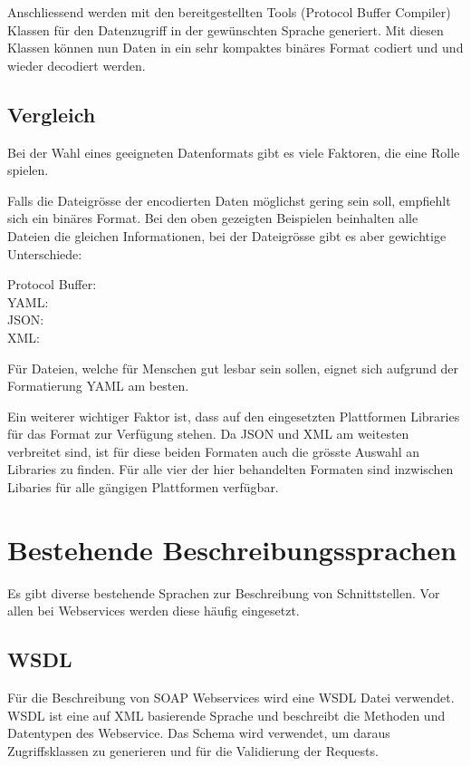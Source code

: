 Anschliessend werden mit den bereitgestellten Tools (Protocol Buffer Compiler) Klassen für den Datenzugriff in der gewünschten Sprache generiert. Mit diesen Klassen können nun Daten in ein sehr kompaktes binäres Format codiert und und wieder decodiert werden.

\subsection{Vergleich}

Bei der Wahl eines geeigneten Datenformats gibt es viele Faktoren, die eine Rolle spielen.

Falls die Dateigrösse der encodierten Daten möglichst gering sein soll, empfiehlt sich ein binäres Format. Bei den oben gezeigten Beispielen beinhalten alle Dateien die gleichen Informationen, bei der Dateigrösse gibt es aber gewichtige Unterschiede:

Protocol Buffer:   \\
YAML:              \\
JSON:              \\
XML:              

Für Dateien, welche für Menschen gut lesbar sein sollen, eignet sich aufgrund der Formatierung YAML am besten. 

Ein weiterer wichtiger Faktor ist, dass auf den eingesetzten Plattformen Libraries für das Format zur Verfügung stehen. Da JSON und XML am weitesten verbreitet sind, ist für diese beiden Formaten auch die grösste Auswahl an Libraries zu finden. Für alle vier der hier behandelten Formaten sind inzwischen Libaries für alle gängigen Plattformen verfügbar.


\section{Bestehende Beschreibungssprachen}

Es gibt diverse bestehende Sprachen zur Beschreibung von Schnittstellen. Vor allen bei Webservices werden diese häufig eingesetzt.

\subsection{WSDL}
Für die Beschreibung von SOAP Webservices wird eine WSDL Datei verwendet. WSDL ist eine auf XML basierende Sprache und beschreibt die Methoden und Datentypen des Webservice. Das Schema wird verwendet, um daraus Zugriffsklassen zu generieren und für die Validierung der Requests.

